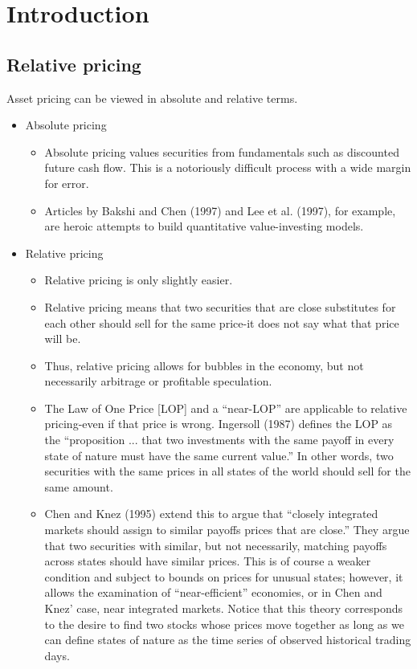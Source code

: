 \section{Introduction}


\subsection{Relative pricing}
Asset pricing can be viewed in absolute and relative terms. 
\begin{itemize}
\item Absolute pricing
\begin{itemize}
\item Absolute pricing values securities from fundamentals such as discounted future cash flow. This is a notoriously difficult process with a wide margin for error. 
\item Articles by Bakshi and Chen (1997) and Lee et al. (1997), for
example, are heroic attempts to build quantitative value-investing models.
\end{itemize}
\item Relative pricing
\begin{itemize}
\item Relative pricing is only slightly easier. 
\item Relative pricing means that two
securities that are close substitutes for each other should sell for the same
price-it does not say what that price will be. 
\item Thus, relative pricing allows
for bubbles in the economy, but not necessarily arbitrage or profitable
speculation. 
\item The Law of One Price [LOP] and a ``near-LOP'' are applicable to relative pricing-even if that price is wrong. Ingersoll (1987) defines the LOP as the ``proposition ... that two investments with the same payoff in every state of nature must have the same current value.'' In other words, two securities with the same prices in all
states of the world should sell for the same amount. 
\item Chen and Knez (1995) extend this to argue that ``closely integrated markets should assign to similar payoffs prices that are close.'' They argue that two securities
with similar, but not necessarily, matching payoffs across states should
have similar prices. This is of course a weaker condition and subject to
bounds on prices for unusual states; however, it allows the examination of
``near-efficient'' economies, or in Chen and Knez' case, near integrated
markets. Notice that this theory corresponds to the desire to find two
stocks whose prices move together as long as we can define states of
nature as the time series of observed historical trading days.
\end{itemize}
\end{itemize}


